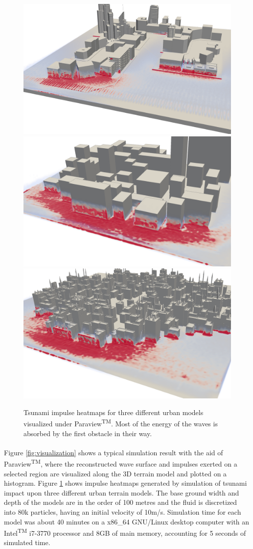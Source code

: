 \documentclass{llncs}
\begin{document}
\begin{figure}[h!]
  \includegraphics[width=.33\textwidth]{figures/impulse-heatmap-0.png}
  \includegraphics[width=.32\textwidth]{figures/impulse-heatmap-1.png}
  \includegraphics[width=.33\textwidth]{figures/impulse-heatmap-2.png}
  \caption{Tsunami impulse heatmaps for three different urban models visualized under
    Paraview\textsuperscript{TM}. Most of the energy of the waves is absorbed by the first
    obstacle in their way.}
  \label{fig:impulse-heatmaps}
\end{figure}

\paragraph{} Figure \ref{fig:visualization} shows a typical simulation result with the aid
of Paraview\textsuperscript{TM}, where the reconstructed wave surface and impulses exerted
on a selected region are visualized along the 3D terrain model and plotted on a
histogram. Figure \ref{fig:impulse-heatmaps} shows impulse heatmaps generated by
simulation of tsunami impact upon three different urban terrain models. The base ground
width and depth of the models are in the order of 100 metres and the fluid is discretized
into 80k particles, having an initial velocity of 10m/s. Simulation time for each model
was about 40 minutes on a x86\_64 GNU/Linux desktop computer with an
Intel\textsuperscript{TM} i7-3770 processor and 8GB of main memory, accounting for 5
seconds of simulated time.
\end{document}
